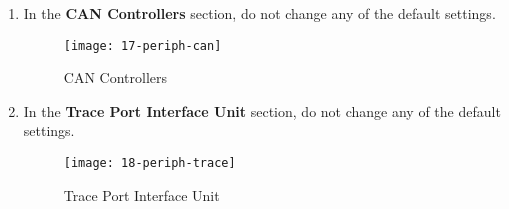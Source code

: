 \begin{flushleft}
\begin{enumerate}[
	label=\textbf{Step \arabic*.},
	leftmargin=*,
	widest={00},
	align=left]
\begin{enumerate}[
	label=\textbf{Step \arabic{enumi}\alph*.},
	leftmargin=*,
	align=left]

\item Select \textbf{HPS I/O Set 0} for the \textbf{I2C0 pin}  parameter.

\item Select \textbf{HPS I/O Set 0} for the \textbf{I2C1 pin}  parameter.

\item Select \textbf{I2C} for the \textbf{I2C0 mode}  parameter.

\item Select \textbf{I2C} for the \textbf{I2C1 mode} parameter.

\end{enumerate}

It should look like this after you do.

\begin{figure}[H]
\centering
\texttt{[image: 16-periph-i2c]}
\caption{I2C Controllers}
\label{fig:16-periph-i2c}
\end{figure}

\item In the \textbf{CAN Controllers} section, do not change any of the default settings.

\begin{figure}[H]
\centering
\texttt{[image: 17-periph-can]}
\caption{CAN Controllers}
\label{fig:17-periph-can}
\end{figure}

\item In the \textbf{Trace Port Interface Unit} section, do not change any of the default settings.

\begin{figure}[H]
\centering
\texttt{[image: 18-periph-trace]}
\caption{Trace Port Interface Unit}
\label{fig:18-periph-trace}
\end{figure}

\newpage


\end{enumerate}
\end{flushleft}
